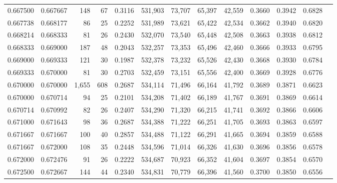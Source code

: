 \begin{tabular}{rrrrrrrrrrrrr}
0.667500 & 0.667667 &   148 &  67 &                                     0.3116 & 531,903 &  73,707 &  65,397 &  42,559 & 0.3660 & 0.3942 & 0.6828 \\
0.667738 & 0.668177 &    86 &  25 &                                     0.2252 & 531,989 &  73,621 &  65,422 &  42,534 & 0.3662 & 0.3940 & 0.6820 \\
0.668214 & 0.668333 &    81 &  26 &                                     0.2430 & 532,070 &  73,540 &  65,448 &  42,508 & 0.3663 & 0.3938 & 0.6812 \\
0.668333 & 0.669000 &   187 &  48 &                                     0.2043 & 532,257 &  73,353 &  65,496 &  42,460 & 0.3666 & 0.3933 & 0.6795 \\
0.669000 & 0.669333 &   121 &  30 &                                     0.1987 & 532,378 &  73,232 &  65,526 &  42,430 & 0.3668 & 0.3930 & 0.6784 \\
0.669333 & 0.670000 &    81 &  30 &                                     0.2703 & 532,459 &  73,151 &  65,556 &  42,400 & 0.3669 & 0.3928 & 0.6776 \\
0.670000 & 0.670000 & 1,655 & 608 &                                     0.2687 & 534,114 &  71,496 &  66,164 &  41,792 & 0.3689 & 0.3871 & 0.6623 \\
0.670000 & 0.670714 &    94 &  25 &                                     0.2101 & 534,208 &  71,402 &  66,189 &  41,767 & 0.3691 & 0.3869 & 0.6614 \\
0.670714 & 0.670992 &    82 &  26 &                                     0.2407 & 534,290 &  71,320 &  66,215 &  41,741 & 0.3692 & 0.3866 & 0.6606 \\
0.671000 & 0.671643 &    98 &  36 &                                     0.2687 & 534,388 &  71,222 &  66,251 &  41,705 & 0.3693 & 0.3863 & 0.6597 \\
0.671667 & 0.671667 &   100 &  40 &                                     0.2857 & 534,488 &  71,122 &  66,291 &  41,665 & 0.3694 & 0.3859 & 0.6588 \\
0.671667 & 0.672000 &   108 &  35 &                                     0.2448 & 534,596 &  71,014 &  66,326 &  41,630 & 0.3696 & 0.3856 & 0.6578 \\
0.672000 & 0.672476 &    91 &  26 &                                     0.2222 & 534,687 &  70,923 &  66,352 &  41,604 & 0.3697 & 0.3854 & 0.6570 \\
0.672500 & 0.672667 &   144 &  44 &                                     0.2340 & 534,831 &  70,779 &  66,396 &  41,560 & 0.3700 & 0.3850 & 0.6556 \\

\end{tabular}
